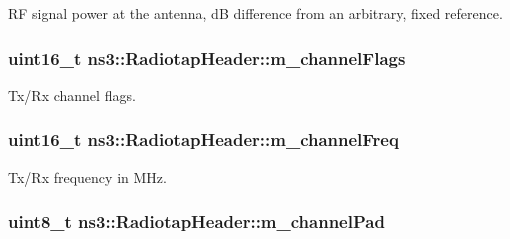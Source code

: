 RF signal power at the antenna, dB difference from an arbitrary, fixed reference. 

\subsubsection[{\texorpdfstring{m\+\_\+channel\+Flags}{m_channelFlags}}]{\setlength{\rightskip}{0pt plus 5cm}uint16\+\_\+t ns3\+::\+Radiotap\+Header\+::m\+\_\+channel\+Flags\hspace{0.3cm}{\ttfamily [private]}}\hypertarget{classns3_1_1RadiotapHeader_a83224ae4fad31022b47599c1fea398af}{}\label{classns3_1_1RadiotapHeader_a83224ae4fad31022b47599c1fea398af}


Tx/\+Rx channel flags. 

\subsubsection[{\texorpdfstring{m\+\_\+channel\+Freq}{m_channelFreq}}]{\setlength{\rightskip}{0pt plus 5cm}uint16\+\_\+t ns3\+::\+Radiotap\+Header\+::m\+\_\+channel\+Freq\hspace{0.3cm}{\ttfamily [private]}}\hypertarget{classns3_1_1RadiotapHeader_aee1725754e23881dd23c73d75c3417a7}{}\label{classns3_1_1RadiotapHeader_aee1725754e23881dd23c73d75c3417a7}


Tx/\+Rx frequency in M\+Hz. 

\subsubsection[{\texorpdfstring{m\+\_\+channel\+Pad}{m_channelPad}}]{\setlength{\rightskip}{0pt plus 5cm}uint8\+\_\+t ns3\+::\+Radiotap\+Header\+::m\+\_\+channel\+Pad\hspace{0.3cm}{\ttfamily [private]}}\hypertarget{classns3_1_1RadiotapHeader_ae6938e8beb4f5eb3c30574fc3b01775d}{}\label{classns3_1_1RadiotapHeader_ae6938e8beb4f5eb3c30574fc3b01775d}


